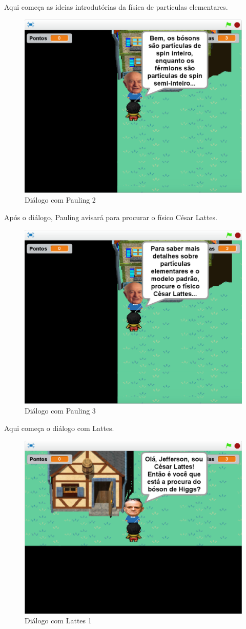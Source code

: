 \documentclass[12pt,fleqn]{book} %
\begin{document}
Aqui começa as ideias introdutórias da física de partículas elementares.

\begin{figure}[h]
	\centering
	\includegraphics[width=0.65 \textwidth]{Produto/jogo_7}
	\caption{Diálogo com Pauling 2}
	\label{fig:app_a:jogo7}
\end{figure}

\newpage

Após o diálogo, Pauling avisará para procurar o físico César Lattes.

\begin{figure}[h]
	\centering
	\includegraphics[width=0.65 \textwidth]{Produto/jogo_8}
	\caption{Diálogo com Pauling 3}
	\label{fig:app_a:jogo8}
\end{figure}

Aqui começa o diálogo com Lattes.

\begin{figure}[h]
	\centering
	\includegraphics[width=0.65 \textwidth]{Produto/jogo_9}
	\caption{Diálogo com Lattes 1}
	\label{fig:app_a:jogo9}
\end{figure}
\end{document}
